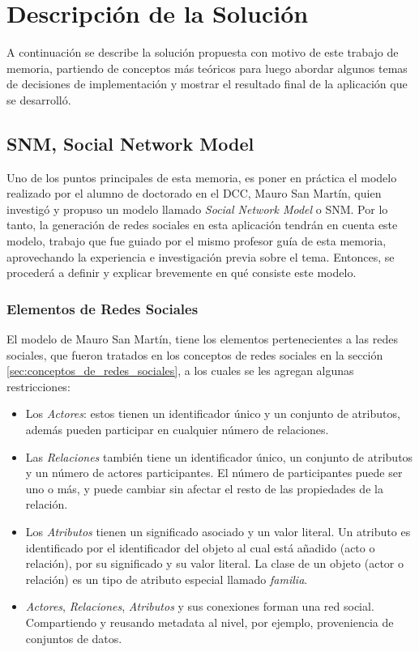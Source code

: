 \chapter{Descripción de la Solución}
\label{chap:descripcion_solucion}

A continuación se describe la solución propuesta con motivo de este trabajo de memoria, partiendo de conceptos más teóricos para luego abordar algunos temas de decisiones de implementación y mostrar el resultado final de la aplicación que se desarrolló.

\section{SNM, Social Network Model} %
\label{sec:snm_social_network_model}

Uno de los puntos principales de esta memoria, es poner en práctica el modelo realizado por el alumno de doctorado en el DCC, Mauro San Martín\cite{tesismauro}, quien investigó y propuso un modelo llamado \emph{Social Network Model} o SNM. Por lo tanto, la generación de redes sociales en esta aplicación tendrán en cuenta este modelo, trabajo que fue guiado por el mismo profesor guía de esta memoria, aprovechando la experiencia e investigación previa sobre el tema. Entonces, se procederá a definir y explicar brevemente en qué consiste este modelo.

\subsection{Elementos de Redes Sociales} %
\label{sub:elementos_de_redes_sociales}

El modelo de Mauro San Martín, tiene los elementos pertenecientes a las redes sociales, que fueron tratados en los conceptos de redes sociales en la sección \ref{sec:conceptos_de_redes_sociales}, a los cuales se les agregan algunas restricciones:

  \begin{itemize}
    \item Los \emph{Actores}: estos tienen un identificador único y un conjunto de atributos, además pueden participar en cualquier número de relaciones.
    \item Las \emph{Relaciones} también tiene un identificador único, un conjunto de atributos y un número de actores participantes. El número de participantes puede ser uno o más, y puede cambiar sin afectar el resto de las propiedades de la relación.
    \item Los \emph{Atributos} tienen un significado asociado y un valor literal. Un atributo es identificado por el identificador del objeto al cual está añadido (acto o relación), por su significado y su valor literal. La clase de un objeto (actor o relación) es un tipo de atributo especial llamado \emph{familia}.
    \item \emph{Actores}, \emph{Relaciones}, \emph{Atributos} y sus conexiones forman una red social. Compartiendo y reusando metadata al nivel, por ejemplo, proveniencia de conjuntos de datos.
  \end{itemize}
  
